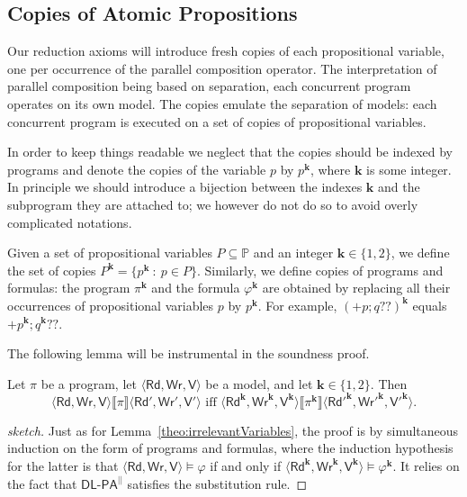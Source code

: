 \documentclass{llncs}
\newcommand{\cp}[2]{{#2}^\mathbf{#1}}
\newcommand{\pll}{ {||} }							%
\newcommand{\readset}{\mathsf{Rd}}
\newcommand{\valuset}{\mathsf{V}}
\newcommand{\writeset}{\mathsf{Wr}}
\newcommand{\testendo}{?\!\!?}			%
\newcommand{\DlpaPll}{\ensuremath{\mathsf{DL\text{-}PA}^\pll}\xspace}
\newcommand{\assgntopV}[1]{{\mathtt {+} #1}}
\newcommand{\intPgm}[1]{\llbracket #1 \rrbracket}
\renewcommand{\phi}{\varphi}
\newcommand{\propset}{\mathbb P}
\newcommand{\propsetOf}[1]{\propset_{#1}}
\newcommand{\set}[1]{\{#1\}}
\newcommand{\suchthat}{~ : ~}
\newcommand{\tuple}[1]{ \langle #1 \rangle}
\begin{document}
\subsection{Copies of Atomic Propositions}\label{sec:copyVars}

Our reduction axioms will introduce fresh copies of each propositional variable, one per occurrence of the parallel composition operator. 
The interpretation of parallel composition being based on separation, each concurrent program operates on its own model.
The copies emulate the separation of models: each concurrent program is executed on a set of copies of propositional variables.

In order to keep things readable we neglect that the copies should be indexed by programs
and denote the copies of the variable $p$ by $\cp k p$, where $\mathbf{k}$ is some integer. 
In principle we should introduce a bijection between the indexes $\mathbf{k}$ and the subprogram they are attached to;
we however do not do so to avoid overly complicated notations.

Given a set of propositional variables $P \subseteq \propset$ and an integer $\mathbf{k} \in \set{1,2}$, we define the set of copies
$\cp{k} P = \{ \cp{k} p \suchthat p \in P\}$. 
Similarly, we define copies of programs and formulas:
the program $\cp{k} \pi$ and the formula $\cp{k} \phi$ are obtained by replacing all their occurrences of
propositional variables $p$ by $\cp k p$. 
For example, $\cp{k} {(\assgntopV p ; q \testendo )}$ equals 
$ \assgntopV{ \cp{k} p } ; \cp{k} q \testendo $.

The following lemma will be instrumental in the soundness proof. 

\begin{lemma}\label{theo:copies}
Let $\pi$ be a program, 
let $\tuple{\readset,\writeset,\valuset}$ be a model, and 
let $\mathbf{k} \in \set{1,2}$. 
Then 
$$ \tuple{\readset,\writeset,\valuset} \intPgm{\pi} \tuple{\readset',\writeset',\valuset'} \text{ iff } 
\tuple{ \cp k {\readset},\cp k {\writeset},\cp k {\valuset}} \intPgm{\cp k \pi} \tuple{\cp k {\readset'},\cp k {\writeset'},\cp k {\valuset'}} . $$
\end{lemma}
\begin{proof}[sketch]
Just as for Lemma~\ref{theo:irrelevantVariables}, the proof is by simultaneous induction on the form of programs and formulas, where the induction hypothesis for the latter is that 
$\tuple{\readset, \writeset, \valuset} \models \phi$ if and only if
$\tuple{\cp k \readset, \cp k \writeset, \cp k \valuset} \models \cp k \phi$.
It relies on the fact that \DlpaPll satisfies the substitution rule.
\end{proof}
\end{document}
